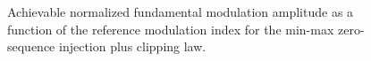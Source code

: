 \begin{frame}
\begin{figure}
        \caption{Achievable normalized fundamental modulation amplitude as a function of the reference modulation index for the min-max zero-sequence injection plus clipping law.}
        \label{fig:min_max_injection_fundamental_modulation_characteristic}
    \end{figure}
\end{frame}


